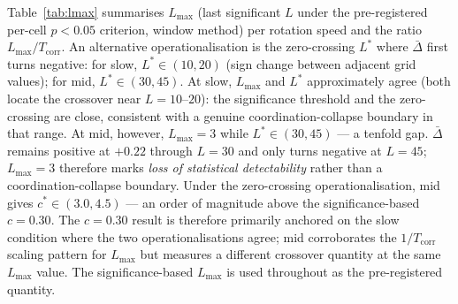 \documentclass[sigconf,anonymous]{aamas}
\newcommand{\Dbar}{\bar{\Delta}}
\newcommand{\Lmax}{L_{\max}}
\newcommand{\Tcorr}{T_{\mathrm{corr}}}
\begin{document}
Table~\ref{tab:lmax} summarises $\Lmax$ (last significant $L$
under the pre-registered per-cell $p{<}0.05$ criterion,
window method) per rotation speed and the ratio $\Lmax/\Tcorr$.
An alternative operationalisation is the zero-crossing $L^*$
where $\Dbar$ first turns negative: for slow, $L^* \in (10, 20)$
(sign change between adjacent grid values); for mid, $L^* \in (30, 45)$.
At slow, $\Lmax$ and $L^*$ approximately agree (both locate the crossover
near $L{=}10$--$20$): the significance threshold and the zero-crossing
are close, consistent with a genuine coordination-collapse boundary
in that range.
At mid, however, $\Lmax{=}3$ while $L^*{\in}(30, 45)$ —
a tenfold gap.  $\Dbar$ remains positive at $+0.22$ through $L{=}30$
and only turns negative at $L{=}45$; $\Lmax{=}3$ therefore marks
\emph{loss of statistical detectability} rather than a coordination-collapse
boundary.  Under the zero-crossing operationalisation, mid gives
$c^* \in (3.0, 4.5)$ — an order of magnitude above the significance-based
$c{=}0.30$.  The $c{=}0.30$ result is therefore primarily anchored on
the slow condition where the two operationalisations agree; mid corroborates
the $1/\Tcorr$ scaling pattern for $\Lmax$ but measures a different
crossover quantity at the same $\Lmax$ value.  The significance-based
$\Lmax$ is used throughout as the pre-registered quantity.
\end{document}
